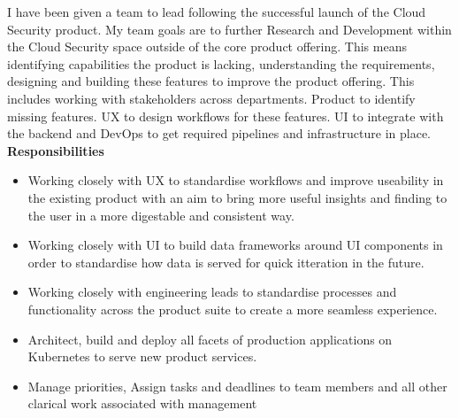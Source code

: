 \documentclass[10pt,a4paper]{altacv}
\begin{document}
I have been given a team to lead following the successful launch of the Cloud Security product. My team goals are to further Research and Development within the Cloud Security space outside of the core product offering. This means identifying capabilities the product is lacking, understanding the requirements, designing and building these features to improve the product offering. This includes working with stakeholders across departments. Product to identify missing features. UX to design workflows for these features. UI to integrate with the backend and DevOps to get required pipelines and infrastructure in place.   
\newline
\newline
\textbf{Responsibilities}
\begin{itemize}
  \item Working closely with UX to standardise workflows and improve useability in the existing product with an aim to bring more useful insights and finding to the user in a more digestable and consistent way.
  \item Working closely with UI to build data frameworks around UI components in order to standardise how data is served for quick itteration in the future. 
  \item Working closely with engineering leads to standardise processes and functionality across the product suite to create a more seamless experience.
  \item Architect, build and deploy all facets of production applications on Kubernetes to serve new product services.
  \item Manage priorities, Assign tasks and deadlines to team members and all other clarical work associated with management
\end{itemize}
\divider

\end{document}

